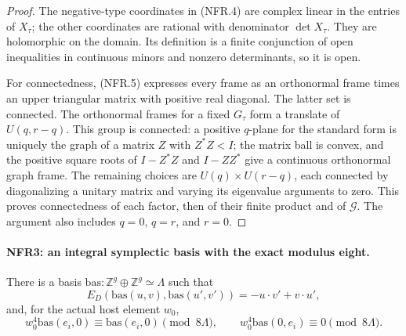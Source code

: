 \begin{proof}
The negative-type coordinates in (NFR.4) are complex linear in
the entries of $X_\tau$; the other coordinates are rational with
denominator $\det X_\tau$.  They are holomorphic on the domain.
Its definition is a finite conjunction of open inequalities in
continuous minors and nonzero determinants, so it is open.

For connectedness, (NFR.5) expresses every frame as an
orthonormal frame times an upper triangular matrix with positive
real diagonal.  The latter set is connected.  The orthonormal
frames for a fixed $G_\tau$ form a translate of $U(q,r-q)$.
This group is connected: a positive $q$-plane for the standard
form is uniquely the graph of a matrix $Z$ with $Z^*Z<I$;
the matrix ball is convex, and the positive square roots of
$I-Z^*Z$ and $I-ZZ^*$ give a continuous orthonormal graph frame.
The remaining choices are $U(q)\times U(r-q)$, each connected
by diagonalizing a unitary matrix and varying its eigenvalue
arguments to zero.  This proves connectedness of each factor,
then of their finite product and of $\mathcal G$.
The argument also includes $q=0$, $q=r$, and $r=0$.
\end{proof}

\paragraph{NFR3: an integral symplectic basis with the exact modulus eight.}
\label{claim:NFR3}
There is a basis
$\mathrm{bas}:\mathbb Z^g\oplus\mathbb Z^g\simeq\Lambda$ such that
\[
 E_D(\mathrm{bas}(u,v),\mathrm{bas}(u',v'))
                      =-u\cdot v'+v\cdot u',
 \tag{NFR.8}
\]
and, for the actual host element $w_0$,
\[
 w_0^4\mathrm{bas}(e_i,0)\equiv\mathrm{bas}(e_i,0)\pmod{8\Lambda},
 \qquad w_0^4\mathrm{bas}(0,e_i)\equiv0\pmod{8\Lambda}.
 \tag{NFR.9}
\]

